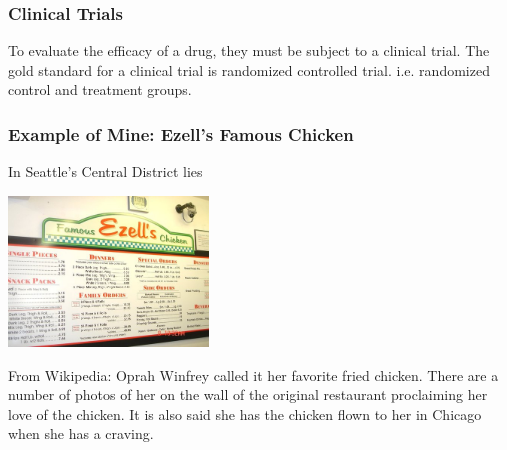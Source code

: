 \documentclass[handout]{beamer}
\newcommand{\blue}[1]{\textcolor{blue2}{#1}}
\begin{document}
\begin{frame}
\frametitle{Clinical Trials}

To evaluate the efficacy of a drug, they must be subject to a \blue{clinical trial}.  \pause The gold standard for a clinical trial is \blue{randomized controlled trial}.  i.e. randomized control and treatment groups.  

\vspace{5cm}


\end{frame}


\begin{frame}
\frametitle{Example of Mine: Ezell's Famous Chicken}
In Seattle's Central District lies
\begin{center}
\includegraphics[height=4cm]{figure/ezells.jpg}
\end{center}

\pause From Wikipedia: Oprah Winfrey called it her favorite fried chicken. There are a number of photos of her on the wall of the original restaurant proclaiming her love of the chicken. It is also said she has the chicken flown to her in Chicago when she has a craving.

\end{frame}
\end{document}

